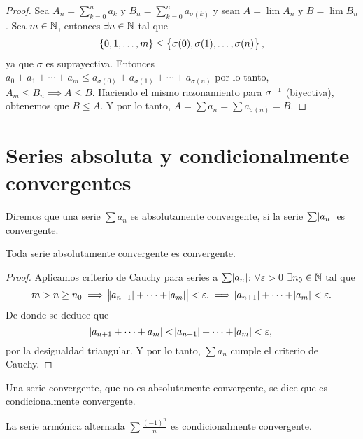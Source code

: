 \begin{proof}
    Sea $A_n = \sum\limits_{k=0}^n a_k$ y $B_n = \sum\limits_{k=0}^n a_{\sigma(k)}$ y sean
    $A = \lim A_n$ y $B = \lim B_n$. Sea
    $m \in \mathbb{N}$, entonces $\exists n \in \mathbb{N}$ tal que
    \[
        \left\{0,1, \dots, m\right\} \leq \left\{\sigma(0), \sigma(1), \dots, \sigma(n)\right\},
    \]
    ya que $\sigma$ es suprayectiva. Entonces $a_0 + a_1 + \cdots + a_m \leq a_{\sigma(0)} +
    a_{\sigma(1)} + \cdots + a_{\sigma(n)}$ por lo tanto, $A_m \leq B_n \implies A \leq B$.
    Haciendo el mismo razonamiento para $\sigma^{-1}$ (biyectiva), obtenemos que $B \leq A$.
    Y por lo tanto, $A = \sum a_n = \sum a_{\sigma(n)} = B$.
\end{proof}

\section{Series absoluta y condicionalmente convergentes}

\begin{defi}
  Diremos que una serie $\sum a_n$ es absolutamente convergente, si la serie $\sum \abs{a_n}$ es convergente.
\end{defi}

\begin{prop}
  Toda serie absolutamente convergente es convergente.
\end{prop}

\begin{proof}
  Aplicamos criterio de Cauchy para series a $\sum \abs{a_n}$: $\forall \varepsilon > 0$ $\exists n_0 \in \mathbb{N}$
  tal que
  \[
    m > n \geq n_0 \implies \abs{\abs{a_{n+1}} + \cdots + \abs{a_m}} < \varepsilon .\implies
    \abs{a_{n+1}} + \cdots + \abs{a_m} < \varepsilon.
  \]
  De donde se deduce que
  \[
    \abs{a_{n+1} + \cdots + a_m} < \abs{a_{n+1}} + \cdots + \abs{a_m} < \varepsilon,
  \]
  por la desigualdad triangular. Y por lo tanto, $\sum a_n$ cumple el criterio de Cauchy.

\end{proof}

\begin{defi}
  Una serie convergente, que no es absolutamente convergente, se dice que es condicionalmente convergente.
\end{defi}

\begin{example}
  La serie armónica alternada $\sum \frac{(-1)^n}{n}$ es condicionalmente convergente.
\end{example}

